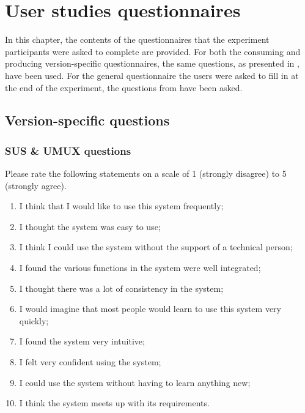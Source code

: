 \chapter{User studies questionnaires}

In this chapter, the contents of the questionnaires that the experiment participants were asked to complete are provided. For both the consuming and producing version-specific questionnaires, the same questions, as presented in , have been used. For the general questionnaire the users were asked to fill in at the end of the experiment, the questions from  have been asked.

\section{Version-specific questions}
\subsection*{SUS \& UMUX questions}
Please rate the following statements on a scale of 1 (strongly disagree) to 5 (strongly agree).
\begin{enumerate}
\item I think that I would like to use this system frequently;
\item I thought the system was easy to use;
\item I think I could use the system without the support of a technical person;
\item I found the various functions in the system were well integrated;
\item I thought there was a lot of consistency in the system;
\item I would imagine that most people would learn to use this system very quickly;
\item I found the system very intuitive;
\item I felt very confident using the system;
\item I could use the system without having to learn anything new;
\item I think the system meets up with its requirements.
\end{enumerate}

